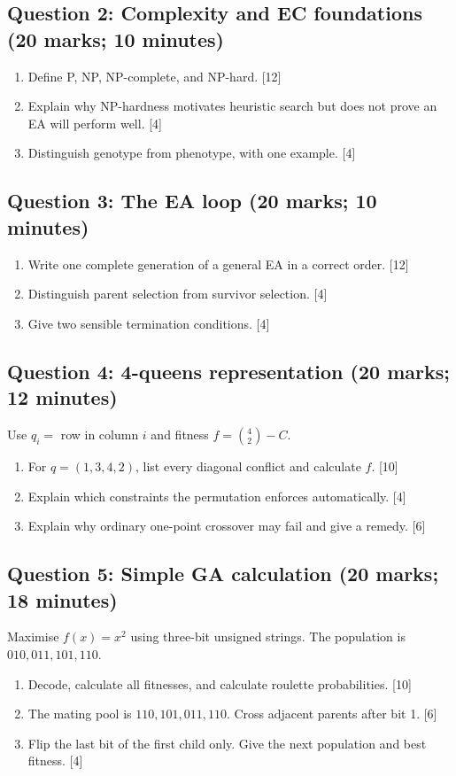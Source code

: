\documentclass[11pt,a4paper]{article}
\begin{document}
\subsection*{Question 2: Complexity and EC foundations (20 marks; 10 minutes)}
\begin{enumerate}[label=(\alph*)]
\item Define P, NP, NP-complete, and NP-hard. \hfill[12]
\item Explain why NP-hardness motivates heuristic search but does not prove an EA will perform well. \hfill[4]
\item Distinguish genotype from phenotype, with one example. \hfill[4]
\end{enumerate}

\subsection*{Question 3: The EA loop (20 marks; 10 minutes)}
\begin{enumerate}[label=(\alph*)]
\item Write one complete generation of a general EA in a correct order. \hfill[12]
\item Distinguish parent selection from survivor selection. \hfill[4]
\item Give two sensible termination conditions. \hfill[4]
\end{enumerate}

\subsection*{Question 4: 4-queens representation (20 marks; 12 minutes)}
Use $q_i=$ row in column $i$ and fitness $f=\binom42-C$.
\begin{enumerate}[label=(\alph*)]
\item For $q=(1,3,4,2)$, list every diagonal conflict and calculate $f$. \hfill[10]
\item Explain which constraints the permutation enforces automatically. \hfill[4]
\item Explain why ordinary one-point crossover may fail and give a remedy. \hfill[6]
\end{enumerate}

\subsection*{Question 5: Simple GA calculation (20 marks; 18 minutes)}
Maximise $f(x)=x^2$ using three-bit unsigned strings. The population is $010,011,101,110$.
\begin{enumerate}[label=(\alph*)]
\item Decode, calculate all fitnesses, and calculate roulette probabilities. \hfill[10]
\item The mating pool is $110,101,011,110$. Cross adjacent parents after bit 1. \hfill[6]
\item Flip the last bit of the first child only. Give the next population and best fitness. \hfill[4]
\end{enumerate}
\end{document}
